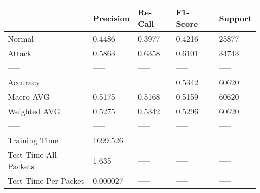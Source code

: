 \begin{tabular}{lllll}
\toprule
{} & Precision & Re-Call & F1-Score & Support \\
\midrule
Normal                &    0.4486 &  0.3977 &   0.4216 &   25877 \\
Attack                &    0.5863 &  0.6358 &   0.6101 &   34743 \\
-----                 &     ----- &   ----- &    ----- &   ----- \\
Accuracy              &           &         &   0.5342 &   60620 \\
Macro AVG             &    0.5175 &  0.5168 &   0.5159 &   60620 \\
Weighted AVG          &    0.5275 &  0.5342 &   0.5296 &   60620 \\
-----                 &     ----- &   ----- &    ----- &   ----- \\
Training Time         &  1699.526 &   ----- &    ----- &   ----- \\
Test Time-All Packets &     1.635 &   ----- &    ----- &   ----- \\
Test Time-Per Packet  &  0.000027 &   ----- &    ----- &   ----- \\
\bottomrule
\end{tabular}
